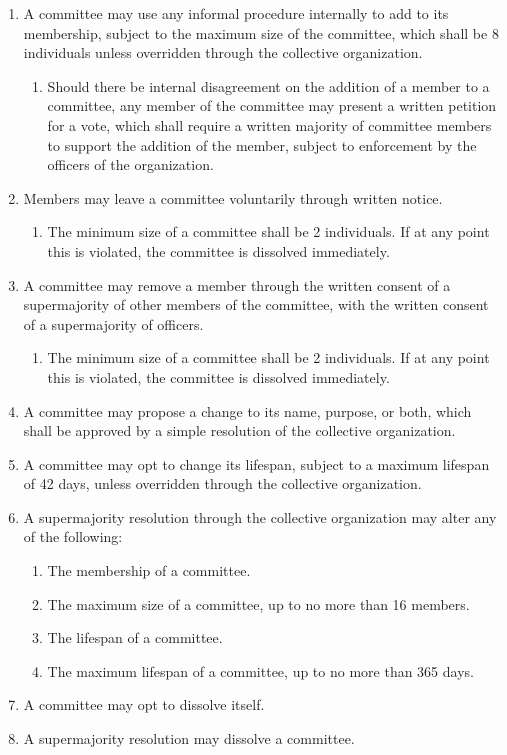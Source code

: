 \documentclass[11pt]{article}
\newcounter{h1}
\newcounter{h2}[h1]
\newcounter{h3}[h2]
\begin{document}
\begin{enumerate}
  \item A committee may use any informal procedure internally to add to its membership, subject to the maximum size of the committee, which shall be 8 individuals unless overridden through the collective organization.  
  \begin{enumerate}
    \item Should there be internal disagreement on the addition of a member to a committee, any member of the committee may present a written petition for a vote, which shall require a written majority of committee members to support the addition of the member, subject to enforcement by the officers of the organization.  
  \end{enumerate}
  \item Members may leave a committee voluntarily through written notice.  
  \begin{enumerate}
    \item The minimum size of a committee shall be 2 individuals. If at any point this is violated, the committee is dissolved immediately.  
  \end{enumerate}
  \item A committee may remove a member through the written consent of a supermajority of other members of the committee, with the written consent of a supermajority of officers.  
  \begin{enumerate}
    \item The minimum size of a committee shall be 2 individuals. If at any point this is violated, the committee is dissolved immediately.  
  \end{enumerate}
  \item A committee may propose a change to its name, purpose, or both, which shall be approved by a simple resolution of the collective organization.  
  \item A committee may opt to change its lifespan, subject to a maximum lifespan of 42 days, unless overridden through the collective organization.  
  \item A supermajority resolution through the collective organization may alter any of the following:  
  \begin{enumerate}
    \item The membership of a committee.  
    \item The maximum size of a committee, up to no more than 16 members.  
    \item The lifespan of a committee.  
    \item The maximum lifespan of a committee, up to no more than 365 days.  
  \end{enumerate}
  \item A committee may opt to dissolve itself.  
  \item A supermajority resolution may dissolve a committee.
\end{enumerate}
\end{document}
